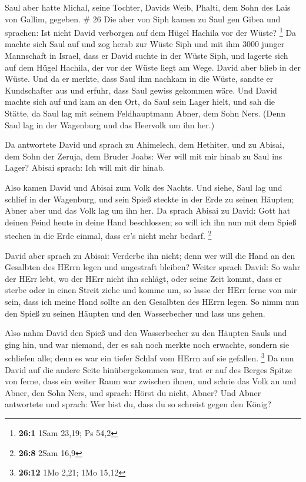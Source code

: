  Saul aber hatte Michal, seine Tochter, Davids Weib,
Phalti, dem Sohn des Lais von Gallim, gegeben. \# 26  Die
aber von Siph kamen zu Saul gen Gibea und sprachen: Ist nicht David
verborgen auf dem Hügel Hachila vor der Wüste? \footnote{\textbf{26:1}
  1Sam 23,19; Ps 54,2}  Da machte sich Saul auf und zog
herab zur Wüste Siph und mit ihm 3000 junger Mannschaft in Israel, dass
er David suchte in der Wüste Siph,  und lagerte sich auf dem
Hügel Hachila, der vor der Wüste liegt am Wege. David aber blieb in der
Wüste. Und da er merkte, dass Saul ihm nachkam in die Wüste,
 sandte er Kundschafter aus und erfuhr, dass Saul gewiss
gekommen wäre.  Und David machte sich auf und kam an den
Ort, da Saul sein Lager hielt, und sah die Stätte, da Saul lag mit
seinem Feldhauptmann Abner, dem Sohn Ners. (Denn Saul lag in der
Wagenburg und das Heervolk um ihn her.)

 Da antwortete David und sprach zu Ahimelech, dem Hethiter,
und zu Abisai, dem Sohn der Zeruja, dem Bruder Joabs: Wer will mit mir
hinab zu Saul ins Lager? Abisai sprach: Ich will mit dir hinab.

 Also kamen David und Abisai zum Volk des Nachts. Und siehe,
Saul lag und schlief in der Wagenburg, und sein Spieß steckte in der
Erde zu seinen Häupten; Abner aber und das Volk lag um ihn her.
 Da sprach Abisai zu David: Gott hat deinen Feind heute in
deine Hand beschlossen; so will ich ihn nun mit dem Spieß stechen in die
Erde einmal, dass er's nicht mehr bedarf. \footnote{\textbf{26:8} 2Sam
  16,9}

 David aber sprach zu Abisai: Verderbe ihn nicht; denn wer
will die Hand an den Gesalbten des HErrn legen und ungestraft bleiben?
 Weiter sprach David: So wahr der HErr lebt, wo der HErr
nicht ihn schlägt, oder seine Zeit kommt, dass er sterbe oder in einen
Streit ziehe und komme um,  so lasse der HErr ferne von mir
sein, dass ich meine Hand sollte an den Gesalbten des HErrn legen. So
nimm nun den Spieß zu seinen Häupten und den Wasserbecher und lass uns
gehen.

 Also nahm David den Spieß und den Wasserbecher zu den
Häupten Sauls und ging hin, und war niemand, der es sah noch merkte noch
erwachte, sondern sie schliefen alle; denn es war ein tiefer Schlaf vom
HErrn auf sie gefallen. \footnote{\textbf{26:12} 1Mo 2,21; 1Mo 15,12}
 Da nun David auf die andere Seite hinübergekommen war,
trat er auf des Berges Spitze von ferne, dass ein weiter Raum war
zwischen ihnen,  und schrie das Volk an und Abner, den Sohn
Ners, und sprach: Hörst du nicht, Abner? Und Abner antwortete und
sprach: Wer bist du, dass du so schreist gegen den König?

